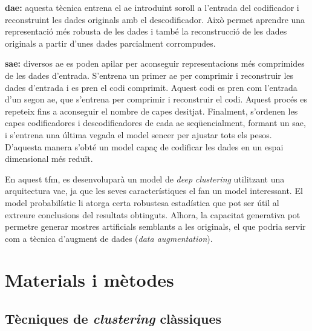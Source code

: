 \documentclass[CAT,BIB]{TFUOC}%
\begin{document}
        \textbf{\Gls{dae}:} aquesta tècnica entrena el \gls{ae} introduint soroll a l'entrada del codificador i reconstruint les dades originals amb el descodificador. Això permet aprendre una representació més robusta de les dades i també la reconstrucció de les dades originals a partir d'unes dades parcialment corrompudes.

        \textbf{\Gls{sae}:} diversos \gls{ae} es poden apilar per aconseguir representacions més comprimides de les dades d'entrada. S'entrena un primer \gls{ae} per comprimir i reconstruir les dades d'entrada i es pren el codi comprimit. Aquest codi es pren com l'entrada d'un segon \gls{ae}, que s'entrena per comprimir i reconstruir el codi. Aquest procés es repeteix fins a aconseguir el nombre de capes desitjat. Finalment, s'ordenen les capes codificadores i descodificadores de cada \gls{ae} seqüencialment, formant un \gls{sae}, i s'entrena una última vegada el model sencer per ajustar tots els pesos. D'aquesta manera s'obté un model capaç de codificar les dades en un espai dimensional més reduït.

        En aquest \gls{tfm}, es desenvoluparà un model de \textit{deep clustering} utilitzant una arquitectura \gls{vae}, ja que les seves característiques el fan un model interessant. El model probabilístic li atorga certa robustesa estadística que pot ser útil al extreure conclusions del resultats obtinguts. Alhora, la capacitat generativa pot permetre generar mostres artificials semblants a les originals, el que podria servir com a tècnica d'augment de dades (\textit{data augmentation}).


\chapter{Materials i mètodes}
\label{c:metodes}

    \section{Tècniques de \textit{clustering} clàssiques}
    \label{s:metodes_classic}
\end{document}
